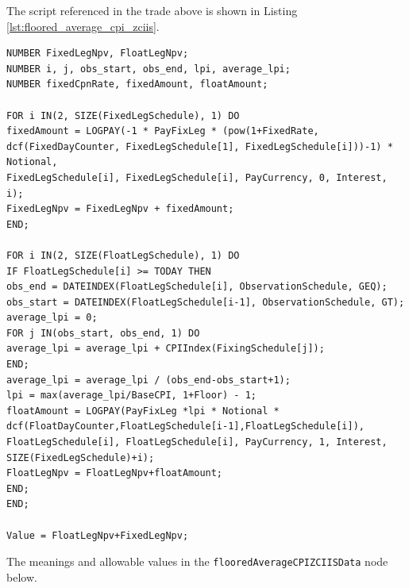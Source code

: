 The script referenced in the trade above is shown in Listing \ref{lst:floored_average_cpi_zciis}.

\begin{listing}[hbt]
\begin{verbatim}
NUMBER FixedLegNpv, FloatLegNpv;
NUMBER i, j, obs_start, obs_end, lpi, average_lpi;
NUMBER fixedCpnRate, fixedAmount, floatAmount;

FOR i IN(2, SIZE(FixedLegSchedule), 1) DO
fixedAmount = LOGPAY(-1 * PayFixLeg * (pow(1+FixedRate, dcf(FixedDayCounter, FixedLegSchedule[1], FixedLegSchedule[i]))-1) * Notional,
FixedLegSchedule[i], FixedLegSchedule[i], PayCurrency, 0, Interest, i);
FixedLegNpv = FixedLegNpv + fixedAmount;
END;

FOR i IN(2, SIZE(FloatLegSchedule), 1) DO
IF FloatLegSchedule[i] >= TODAY THEN
obs_end = DATEINDEX(FloatLegSchedule[i], ObservationSchedule, GEQ);
obs_start = DATEINDEX(FloatLegSchedule[i-1], ObservationSchedule, GT);
average_lpi = 0;
FOR j IN(obs_start, obs_end, 1) DO
average_lpi = average_lpi + CPIIndex(FixingSchedule[j]);
END;
average_lpi = average_lpi / (obs_end-obs_start+1);
lpi = max(average_lpi/BaseCPI, 1+Floor) - 1;
floatAmount = LOGPAY(PayFixLeg *lpi * Notional * dcf(FloatDayCounter,FloatLegSchedule[i-1],FloatLegSchedule[i]),
FloatLegSchedule[i], FloatLegSchedule[i], PayCurrency, 1, Interest, SIZE(FixedLegSchedule)+i);
FloatLegNpv = FloatLegNpv+floatAmount;
END;
END;

Value = FloatLegNpv+FixedLegNpv;
\end{verbatim}
\caption{Payoff script for a Floored Average CPI Zero Coupon Inflation Index Swap.}
\label{lst:floored_average_cpi_zciis}
\end{listing}

The meanings and allowable values in the \lstinline!flooredAverageCPIZCIISData! node below.

